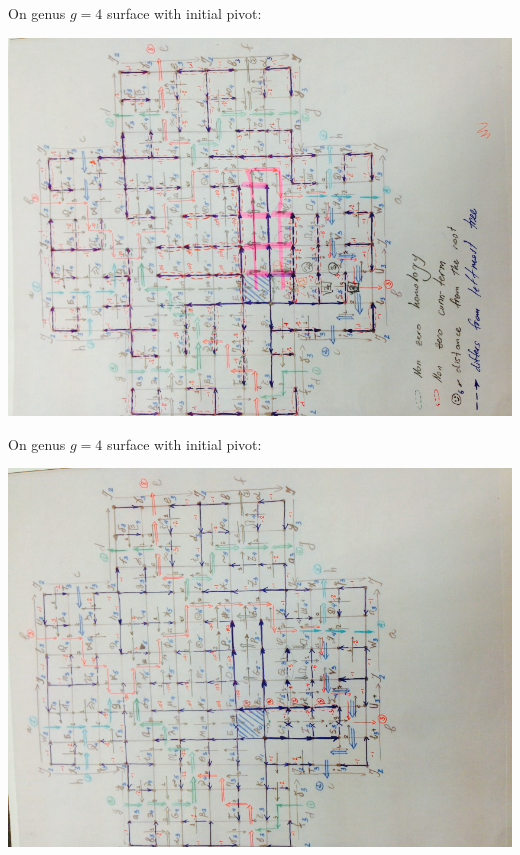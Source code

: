 \documentclass{article}
\begin{document}
\newpage
On genus $g = 4$ surface with initial pivot:
\begin{center}
\includegraphics[angle = -90, scale = 0.7]{genus4_initialPivot.jpg}
\end{center}



\newpage
On genus $g = 4$ surface with initial pivot:
\begin{center}
\includegraphics[angle = -90, scale = 0.7]{genus4_after4Pivots.jpg}
\end{center}
\end{document}

